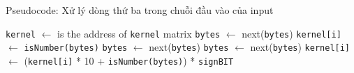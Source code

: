 \documentclass{article}
\begin{document}
\begin{algorithm}
	\caption{Pseudocode: Xử lý dòng thứ ba trong chuỗi đầu vào của input}
	\begin{algorithmic}[1]
		\State \texttt{kernel} $\gets$ is the address of \texttt{kernel} matrix
		\State \texttt{bytes} $\gets$ next(\texttt{bytes})
		\EndIf
		\State \texttt{kernel[i]} $\gets$ \texttt{isNumber(bytes)}
		\State \texttt{bytes} $\gets$ next(\texttt{bytes})
		\EndIf
		\State \texttt{bytes} $\gets$ next(\texttt{bytes})
		\State \texttt{kernel[i]} $\gets$ (\texttt{kernel[i]} * 10 + \texttt{isNumber(bytes)}) * \texttt{signBIT}
		\EndIf
		\EndFor
	\end{algorithmic}
\end{algorithm}
\end{document}
